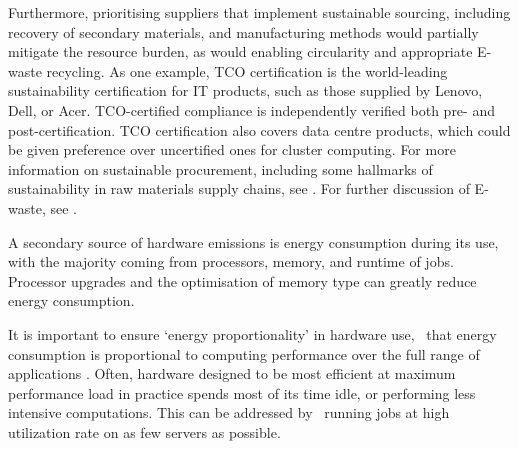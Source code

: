 \documentclass[../SustainableHEP.tex]{subfiles}
\begin{document}
Furthermore, prioritising suppliers that implement sustainable sourcing, including recovery of secondary materials, and manufacturing methods would partially mitigate the resource burden, as would enabling circularity and appropriate E-waste recycling.  As one example, TCO certification \cite{TCO_Certified} is the world-leading sustainability certification for IT products, such as those supplied by Lenovo, Dell, or Acer. TCO-certified compliance is independently verified both pre- and post-certification. TCO certification also covers data centre products, which could be given preference over uncertified ones for cluster computing. For more information on sustainable procurement, including some hallmarks of sustainability in raw materials supply chains, see .  For further discussion of E-waste, see .

A secondary source of hardware emissions is energy consumption during its use, with the majority coming from processors, memory, and runtime of jobs.  Processor upgrades and the optimisation of memory type can greatly reduce energy consumption. 

It is important to ensure
`energy proportionality' in hardware use, \ie\ that energy consumption is proportional to computing performance over the full range of applications \cite{energy-prop-computing}.    Often, hardware designed to be most efficient at maximum performance load in practice spends most of its time idle, or performing less intensive computations. This can be addressed by \eg\ running jobs at high utilization rate on as few servers as possible.  
\end{document}
